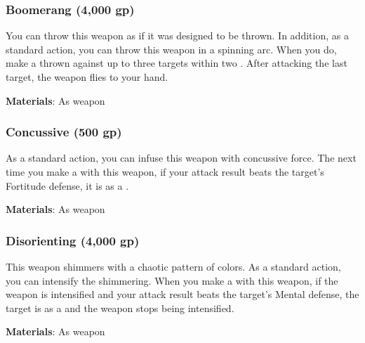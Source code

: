 
\lowercase{\hypertarget{item:Boomerang}{}}\label{item:Boomerang}
\hypertarget{item:Boomerang}{\subsubsection{Boomerang\hfill{} (4,000 gp)}}

You can throw this weapon as if it was designed to be thrown.
In addition, as a standard action, you can throw this weapon in a spinning arc.
When you do, make a thrown  against up to three targets within two .
After attacking the last target, the weapon flies to your hand.



\vspace{0.25em}
\textbf{Materials}: As weapon


\lowercase{\hypertarget{item:Concussive}{}}\label{item:Concussive}
\hypertarget{item:Concussive}{\subsubsection{Concussive\hfill{} (500 gp)}}

As a standard action, you can infuse this weapon with concussive force.
The next time you make a  with this weapon, if your attack result beats the target's Fortitude defense, it is  as a .



\vspace{0.25em}
\textbf{Materials}: As weapon


\lowercase{\hypertarget{item:Disorienting}{}}\label{item:Disorienting}
\hypertarget{item:Disorienting}{\subsubsection{Disorienting\hfill{} (4,000 gp)}}

This weapon shimmers with a chaotic pattern of colors.
As a standard action, you can intensify the shimmering.
When you make a  with this weapon, if the weapon is intensified and your attack result beats the target's Mental defense,
the target is \disoriented as a  and the weapon stops being intensified.



\vspace{0.25em}
\textbf{Materials}: As weapon


